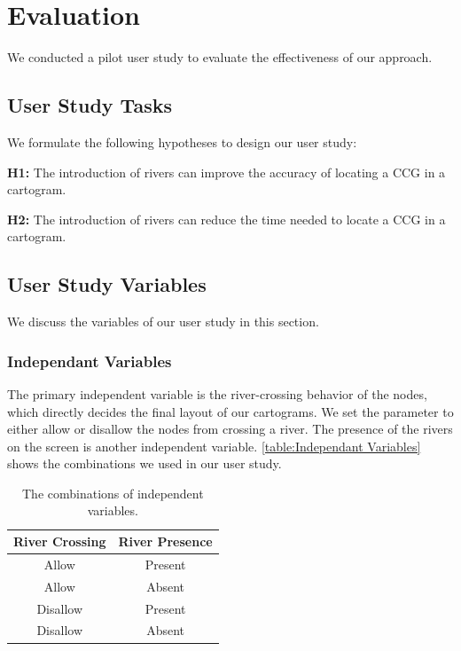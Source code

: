 \color{blue}

\section{Evaluation}

We conducted a pilot user study to evaluate the effectiveness of our approach. 

\subsection{User Study Tasks}

We formulate the following hypotheses to design our user study:

\textbf{H1:} The introduction of rivers can improve the accuracy of locating a CCG in a cartogram.

\textbf{H2:} The introduction of rivers can reduce the time needed to locate a CCG in a cartogram.

\subsection{User Study Variables}

We discuss the variables of our user study in this section.

\subsubsection{Independant Variables}

The primary independent variable is the river-crossing behavior of the nodes, which directly decides the final layout of our cartograms. We set the parameter to either allow or disallow the nodes from crossing a river. The presence of the rivers on the screen is another independent variable. \autoref{table:Independant Variables} shows the combinations we used in our user study.

{
\renewcommand{\arraystretch}{1.5}
\begin{table}[!tb]
	\centering
		\begin{tabulary}{\columnwidth}{|*{2}{c|}}
			\hline
			\textbf{River Crossing} &
			\textbf{River Presence} \\
			\hline
			Allow & Present \\
			\hline
			Allow & Absent \\
			\hline
			Disallow & Present \\
			\hline
			Disallow & Absent \\
			\hline
		\end{tabulary}
	\caption{The combinations of independent variables.}
	\label{table:Independant Variables}
\end{table}
}


